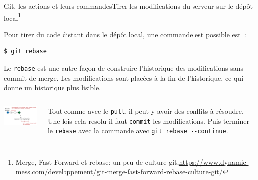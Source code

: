 \documentclass{beamer}
\begin{document}
    \begin{frame}[fragile]{Git, les actions et leurs commandes}{Tirer les modifications du serveur sur le dépôt local\footnote{Merge, Fast-Forward et rebase: un peu de culture git,\url{https://www.dynamic-mess.com/developpement/git-merge-fast-forward-rebase-culture-git/}}}
        \transdissolve

        Pour tirer du code distant dans le dépôt local, une commande est possible est~:
        \begin{lstlisting}[language=sh]
$ git rebase
        \end{lstlisting}

        Le \lstinline{rebase} est une autre façon de construire l'historique des modifications sans commit de merge.
        Les modifications sont placées à la fin de l'historique, ce qui donne un historique plus lisible.
        \begin{columns}
            \begin{center}
                \includegraphics[width=5cm]{image/git-rebase}
            \end{center}
            Tout comme avec le \lstinline{pull}, il peut y avoir des conflits à résoudre.
            Une fois cela resolu il faut \lstinline{commit} les modifications.
            Puis terminer le \lstinline{rebase} avec la commande avec \lstinline{git rebase --continue}\footnotemark.
        \end{columns}
    \end{frame}
\end{document}
